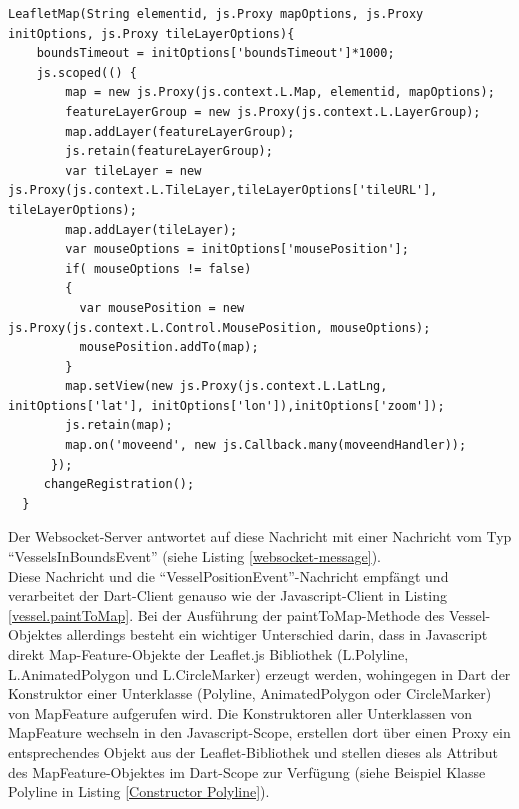 \begin{lstlisting}[caption=Konstruktor des LeafletMap-Objektes mit Zugriff auf den Javascript-Scope, label=LeafletMapConstructor]
LeafletMap(String elementid, js.Proxy mapOptions, js.Proxy initOptions, js.Proxy tileLayerOptions){
    boundsTimeout = initOptions['boundsTimeout']*1000;
    js.scoped(() {
        map = new js.Proxy(js.context.L.Map, elementid, mapOptions);
        featureLayerGroup = new js.Proxy(js.context.L.LayerGroup);
        map.addLayer(featureLayerGroup);
        js.retain(featureLayerGroup);
        var tileLayer = new js.Proxy(js.context.L.TileLayer,tileLayerOptions['tileURL'], tileLayerOptions);
        map.addLayer(tileLayer);
        var mouseOptions = initOptions['mousePosition'];
        if( mouseOptions != false)
        {
          var mousePosition = new js.Proxy(js.context.L.Control.MousePosition, mouseOptions);
          mousePosition.addTo(map);
        }
        map.setView(new js.Proxy(js.context.L.LatLng, initOptions['lat'], initOptions['lon']),initOptions['zoom']);
        js.retain(map);
        map.on('moveend', new js.Callback.many(moveendHandler));
      });
     changeRegistration();
  }
\end{lstlisting}
Der Websocket-Server antwortet auf diese Nachricht mit einer Nachricht vom Typ “VesselsInBoundsEvent” (siehe Listing \ref{websocket-message}).\\
Diese Nachricht und die “VesselPositionEvent”-Nachricht empfängt und verarbeitet der Dart-Client genauso wie der Javascript-Client in Listing \ref{vessel.paintToMap}. Bei der Ausführung der paintToMap-Methode des Vessel-Objektes allerdings besteht ein wichtiger Unterschied darin, dass in Javascript direkt Map-Feature-Objekte der Leaflet.js Bibliothek (L.Polyline, L.AnimatedPolygon und L.CircleMarker) erzeugt werden, wohingegen in Dart der Konstruktor einer Unterklasse (Polyline, AnimatedPolygon oder CircleMarker) von MapFeature aufgerufen wird. Die Konstruktoren aller Unterklassen von MapFeature wechseln in den Javascript-Scope, erstellen dort über einen Proxy ein entsprechendes Objekt aus der Leaflet-Bibliothek und stellen dieses als Attribut des MapFeature-Objektes im Dart-Scope zur Verfügung (siehe Beispiel Klasse Polyline in Listing \ref{Constructor Polyline}).

